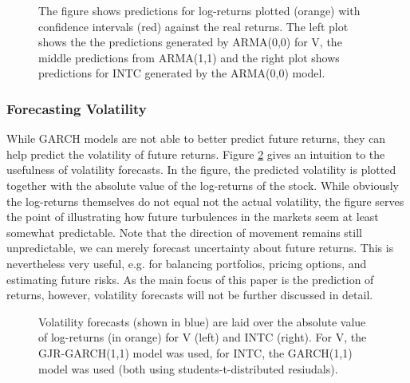 \begin{figure}[h]
    \centering
    \begin{adjustbox}{width = 0.95\textwidth}
    
    
    
    \end{adjustbox}
    \caption{The figure shows predictions for log-returns plotted (orange) with confidence intervals (red) against the real returns. The left plot shows the the predictions generated by ARMA(0,0) for V, the middle predictions from ARMA(1,1) and the right plot shows predictions for INTC generated by the ARMA(0,0) model.}
    \label{fig:V_INTC_ARMA_predictions_plot}
\end{figure}{}
\subsubsection{Forecasting Volatility}
While GARCH models are not able to better predict future returns, they can help predict the volatility of future returns. Figure \ref{fig:volatility_pred} gives an intuition to the usefulness of volatility forecasts. In the figure, the predicted volatility is plotted together with the absolute value of the log-returns of the stock. While obviously the log-returns themselves do not equal not the actual volatility, the figure serves the point of illustrating how future turbulences in the markets seem at least somewhat predictable. Note that the direction of movement remains still unpredictable, we can merely forecast uncertainty about future returns. This is nevertheless very useful, e.g. for balancing portfolios, pricing options, and estimating future risks. As the main focus of this paper is the prediction of returns, however, volatility forecasts will not be further discussed in detail.

\begin{figure}[h]
    \centering
    \begin{adjustbox}{width = 0.95\textwidth}
    
    
    \end{adjustbox}
    \caption{Volatility forecasts (shown in blue) are laid over the absolute value of log-returns (in orange) for V (left) and INTC (right). For V, the GJR-GARCH(1,1) model was used, for INTC, the GARCH(1,1) model was used (both using students-t-distributed resiudals).}
    \label{fig:volatility_pred}
\end{figure}{}


